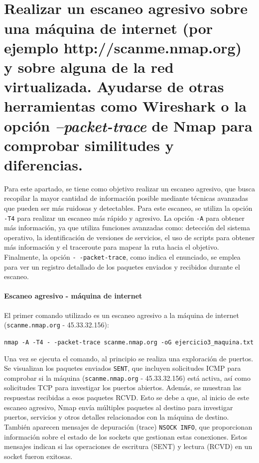\documentclass[a4paper,12pt]{article} %
\begin{document}
\\ \\
\section{Realizar un escaneo agresivo sobre una máquina de internet (por ejemplo http://scanme.nmap.org) y sobre alguna de la red virtualizada. Ayudarse de otras herramientas como Wireshark o la opción \textit{--packet-trace} de Nmap para comprobar similitudes y diferencias. }

Para este apartado, se tiene como objetivo realizar un escaneo agresivo, que busca recopilar la mayor cantidad de información posible mediante técnicas avanzadas que pueden ser más ruidosas y detectables. Para este escaneo, se utiliza la opción \texttt{-T4} para realizar un escaneo más rápido y agresivo. La opción \texttt{-A} para obtener más información, ya que utiliza funciones avanzadas como: detección del sistema operativo, la identificación de versiones de servicios, el uso de scripts para obtener más información y el traceroute para mapear la ruta hacia el objetivo. Finalmente, la opción \texttt{- -packet-trace}, como indica el enunciado, se emplea para ver un registro detallado de los paquetes enviados y recibidos durante el escaneo.

\paragraph{Escaneo agresivo - máquina de internet}
El primer comando utilizado es un escaneo agresivo a la máquina de internet (\texttt{scanme.nmap.org} - 45.33.32.156): 

    \begin{center}
    \texttt{nmap -A -T4 - -packet-trace  scanme.nmap.org -oG ejercicio3\_maquina.txt}
    \end{center}
    
Una vez se ejecuta el comando, al principio se realiza una exploración de puertos. Se visualizan los paquetes enviados \texttt{SENT}, que incluyen solicitudes ICMP para comprobar si la máquina (\texttt{scanme.nmap.org} - 45.33.32.156) está activa, así como solicitudes TCP para investigar los puertos abiertos. Además, se muestran las respuestas recibidas a esos paquetes RCVD. Esto se debe a que, al inicio de este escaneo agresivo, Nmap envía múltiples paquetes al destino para investigar puertos, servicios y otros detalles relacionados con la máquina de destino. También aparecen mensajes de depuración (trace) \texttt{NSOCK INFO}, que proporcionan información sobre el estado de los sockets que gestionan estas conexiones. Estos mensajes indican si las operaciones de escritura (SENT) y lectura (RCVD) en un socket fueron exitosas. 
\\
\end{document}
